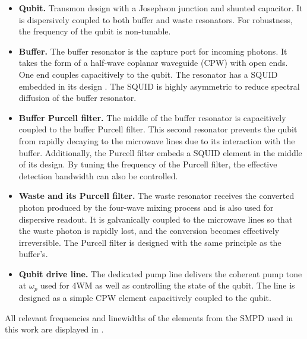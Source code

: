 \begin{itemize}
    \item \textbf{Qubit.} Transmon design with a Josephson junction and shunted capacitor. It is dispersively coupled to both buffer and waste resonators. For robustness, the frequency of the qubit is non-tunable.
    \item \textbf{Buffer.} The buffer resonator is the capture port for incoming photons. It takes the form of a half-wave coplanar waveguide (CPW) with open ends. One end couples capacitively to the qubit. The resonator has a SQUID embedded in its design . The SQUID is highly asymmetric to reduce spectral diffusion of the buffer resonator.
    \item \textbf{Buffer Purcell filter.} The middle of the buffer resonator is capacitively coupled to the buffer Purcell filter. This second resonator prevents the qubit from rapidly decaying to the microwave lines due to its interaction with the buffer. Additionally, the Purcell filter embeds a SQUID element in the middle of its design. By tuning the frequency of the Purcell filter, the effective detection bandwidth can also be controlled.
    \item \textbf{Waste and its Purcell filter.} The waste resonator receives the converted photon produced by the four-wave mixing process and is also used for dispersive readout. It is galvanically coupled to the microwave lines so that the waste photon is rapidly lost, and the conversion becomes effectively irreversible. The Purcell filter is designed with the same principle as the buffer's.
    \item \textbf{Qubit drive line.} The dedicated pump line delivers the coherent pump tone at $\omega_p$ used for 4WM as well as controlling the state of the qubit. The line is designed as a simple CPW element capacitively coupled to the qubit.
\end{itemize}

All relevant frequencies and linewidths of the elements from the SMPD used in this work are displayed in . 

